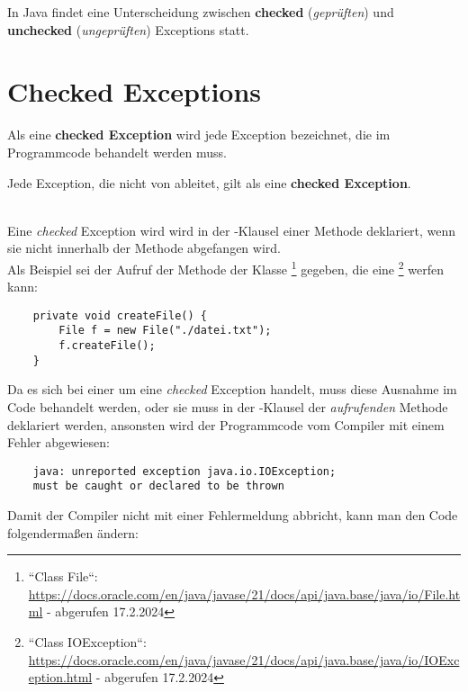 In Java findet eine Unterscheidung zwischen \textbf{checked} (\textit{geprüften}) und \textbf{unchecked} (\textit{ungeprüften}) Exceptions statt.\\

\section{Checked Exceptions}
Als eine \textbf{checked Exception} wird jede Exception bezeichnet, die im Programmcode behandelt werden muss.\\

\begin{tcolorbox}
    Jede Exception, die nicht von  ableitet, gilt als eine \textbf{checked Exception}.
\end{tcolorbox}\\

\noindent
Eine \textit{checked} Exception wird wird in der -Klausel einer Methode deklariert, wenn sie nicht innerhalb der Methode abgefangen wird.\\

\noindent
Als Beispiel sei der Aufruf der Methode  der Klasse \footnote{
    ``Class File``: \url{https://docs.oracle.com/en/java/javase/21/docs/api/java.base/java/io/File.html} - abgerufen 17.2.2024
} gegeben, die eine \footnote{
    ``Class IOException``: \url{https://docs.oracle.com/en/java/javase/21/docs/api/java.base/java/io/IOException.html} - abgerufen 17.2.2024
} werfen kann:

\begin{verbatim}
    private void createFile() {
        File f = new File("./datei.txt");
        f.createFile();
    }
\end{verbatim}

\noindent
Da es sich bei einer  um eine \textit{checked} Exception handelt, muss diese Ausnahme im Code behandelt werden,
oder sie muss in der -Klausel der \textit{aufrufenden} Methode deklariert werden, ansonsten wird der Programmcode vom Compiler mit einem Fehler abgewiesen:

\begin{verbatim}
    java: unreported exception java.io.IOException;
    must be caught or declared to be thrown
\end{verbatim}

\noindent
Damit der Compiler nicht mit einer Fehlermeldung abbricht, kann man den Code folgendermaßen ändern:

